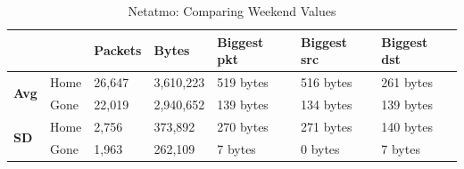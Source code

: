 \begin{table}[H]
    \caption{Netatmo: Comparing Weekend Values}
    \begin{tabular}{ll|l|l|l|l|l|}
        \cline{3-7}
        &      & \textbf{Packets} & \textbf{Bytes} & \textbf{Biggest pkt} & \textbf{Biggest src} & \textbf{Biggest dst} \\ \hline
    \multicolumn{1}{|l|}{\multirow{2}{*}{\textbf{Avg}}} & Home & 26,647           & 3,610,223      & 519 bytes                    & 516 bytes                 & 261 bytes                 \\ \cline{2-7} 
    \multicolumn{1}{|l|}{}                                  & Gone & 22,019           & 2,940,652      & 139 bytes                    & 134 bytes                    & 139 bytes                 \\ \hline
    \multicolumn{1}{|l|}{\multirow{2}{*}{\textbf{SD}}} & Home & 2,756            & 373,892        & 270 bytes                    & 271 bytes                 & 140 bytes                 \\ \cline{2-7} 
    \multicolumn{1}{|l|}{}                                  & Gone & 1,963            & 262,109        & 7 bytes                      & 0 bytes                   & 7 bytes                   \\ \hline
    \end{tabular}
    \label{tab:NetatmoWeekends}
\end{table}

